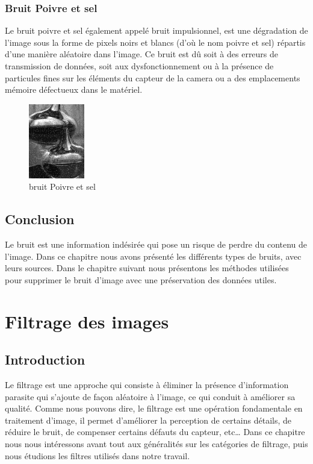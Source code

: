 \documentclass[12pt,a4paper]{report}
\numberwithin{equation}{subsection}
\numberwithin{equation}{section}
\begin{document}
\subsection{Bruit Poivre et sel}
Le bruit poivre et sel également appelé bruit impulsionnel, est une dégradation de l'image sous la forme de pixels noirs et blancs (d’où le nom poivre et sel) répartis d'une manière aléatoire dans l'image. Ce bruit est dû soit à des erreurs de transmission de données, soit aux dysfonctionnement ou à la présence de particules fines sur les éléments du capteur de la camera ou a des emplacements mémoire défectueux dans le matériel.
\begin{figure}[h!]
    \centering
    \includegraphics[height=3.25cm , width=.3\textwidth]{poi.png}
     \caption{bruit Poivre et sel}
\end{figure}
\newpage

\section{Conclusion}
Le bruit est une information indésirée qui pose un risque de perdre du contenu de l’image.\newline
Dans ce chapitre nous avons présenté les différents types de bruits, avec leurs
sources. \newline
Dans le chapitre suivant nous présentons les méthodes utilisées pour supprimer le bruit d’image avec une préservation des données utiles.
\chapter{Filtrage des images}
\section{Introduction}
Le filtrage est une approche qui consiste à éliminer la présence d’information parasite qui
s’ajoute de façon aléatoire à l’image, ce qui conduit à améliorer sa qualité. Comme nous pouvons
dire, le filtrage est une opération fondamentale en traitement d’image, il permet d’améliorer la
perception de certains détails, de réduire le bruit, de compenser certains défauts du capteur, etc… \newline
Dans ce chapitre nous nous intéressons avant tout aux généralités sur les catégories de
filtrage, puis nous étudions les filtres utilisés dans notre travail.
\newline
\end{document}
